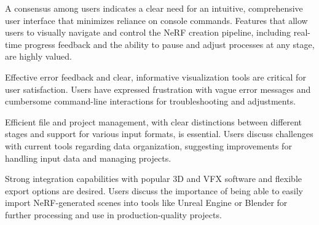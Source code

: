 A consensus among users indicates a clear need for an intuitive, comprehensive user interface that minimizes reliance on console commands.
Features that allow users to visually navigate and control the NeRF creation pipeline, including real-time progress feedback and the ability to pause and adjust processes at any stage, are highly valued. 
\cite{P1, P2, P3}


Effective error feedback and clear, informative visualization tools are critical for user satisfaction. 
Users have expressed frustration with vague error messages and cumbersome command-line interactions for troubleshooting and adjustments. 
\cite{P2, P3}


Efficient file and project management, with clear distinctions between different stages and support for various input formats, is essential. 
Users discuss challenges with current tools regarding data organization, suggesting improvements for handling input data and managing projects​​.
\cite{P1, P3}

Strong integration capabilities with popular 3D and VFX software and flexible export options are desired. 
Users discuss the importance of being able to easily import NeRF-generated scenes into tools like Unreal Engine \cite{noauthor_unreal_nodate} or Blender \cite{noauthor_blender_nodate} for further processing and use in production-quality projects​​.
\cite{P1, P2, P4}


